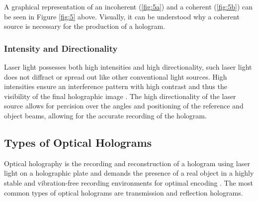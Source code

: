\documentclass[12pt]{article}
\begin{document}
A graphical representation of an incoherent (\ref{fig:5a}) and a coherent (\ref{fig:5b}) can be seen in Figure \ref{fig:5} above. Visually, it can be understood why a coherent
source is necessary for the production of a hologram.

\subsubsection{Intensity and Directionality}

Laser light possesses both high intensities and high directionality, such laser light does not diffract or spread out like other conventional light sources.
High intensities ensure an interference pattern with high contrast and thus the visibility of the final holographic image \cite{kafri1990physics,haken1986laser}.
The high directionality of the laser source allows for percision over the angles and positioning of the reference and object beams, allowing for the accurate recording of the hologram.

\vspace{1.5cm}

\subsection{Types of Optical Holograms}

Optical holography is the recording and reconstruction of a hologram using laser light on a holographic plate and demands the presence of a real object in a highly stable and vibration-free
recording environments for optimal encoding \cite{basicholo1}.
The most common types of optical holograms are transmission and reflection holograms.
\end{document}

